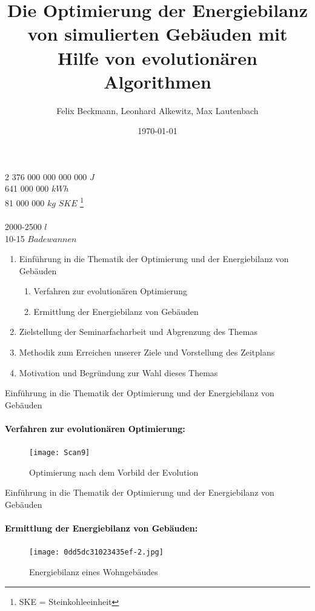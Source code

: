 \documentclass[11pt]{beamer}
\author{Felix Beckmann, Leonhard Alkewitz, Max Lautenbach}
\title{Die Optimierung der Energiebilanz von simulierten Gebäuden mit Hilfe von evolutionären Algorithmen}
\institute{Spezialschulteil des Albert-Schweizer Gymnasium Erfurt}
\date{\today}
\begin{document}
\begin{frame}

\end{frame}

\begin{frame}
\begin{center}
\huge{2 376 000 000 000 000 $J$}  \\  
\pause \huge{641 000 000 $kWh$} \\ 
\pause \huge{81 000 000 $kg$ $SKE$ \footnote{SKE = Steinkohleeinheit}} \\ 
\hrulefill{}  \\
\pause \huge{2000-2500 $l$} \\ 
\pause \huge{10-15 $Badewannen$}
\end{center}
\end{frame}

\begin{frame}
\titlepage
\end{frame}

\begin{frame}
\begin{enumerate}
\item{Einführung in die Thematik der Optimierung und der Energiebilanz von Gebäuden}
\begin{enumerate}
\item{Verfahren zur evolutionären Optimierung}
\item{Ermittlung der Energiebilanz von Gebäuden}
\end{enumerate}
\item{Zielstellung der Seminarfacharbeit und Abgrenzung des Themas}
\item{Methodik zum Erreichen unserer Ziele und Vorstellung des Zeitplans}
\item{Motivation und Begründung zur Wahl dieses Themas}
\end{enumerate}
\end{frame}

\begin{frame}{Einführung in die Thematik der Optimierung und der Energiebilanz von Gebäuden}
\framesubtitle{\large{\textcolor{black}{Verfahren zur evolutionären Optimierung:}}}
\begin{figure}
\texttt{[image: Scan9]}
\caption{Optimierung nach dem Vorbild der Evolution}
\end{figure}
\end{frame}

\begin{frame}{Einführung in die Thematik der Optimierung und der Energiebilanz von Gebäuden}
\framesubtitle{\large{\textcolor{black}{Ermittlung der Energiebilanz von Gebäuden:}}}
\begin{figure}
\texttt{[image: 0dd5dc31023435ef-2.jpg]} 
\caption{Energiebilanz eines Wohngebäudes}
\end{figure}
\end{frame}
\end{document}

